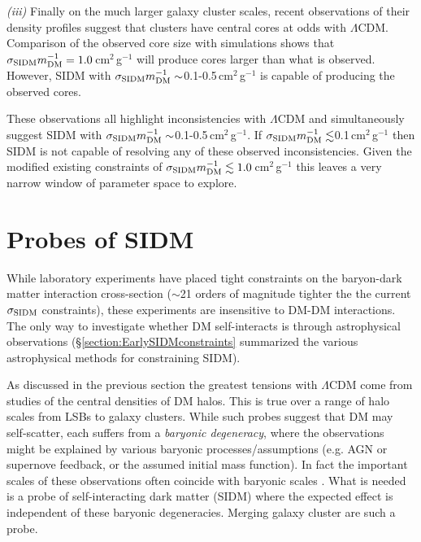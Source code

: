 {\it (iii)} Finally on the much larger galaxy cluster scales, recent observations of their density profiles \citep{Newman:2012wt, Newman:2012tk} suggest that clusters have central cores at odds with $\Lambda$CDM.
Comparison of the observed core size with simulations \citep{Peter:2012vi, Rocha:2012tr} shows that $\sigma_{\rm SIDM}m_{\rm DM}^{-1} = 1.0$\,cm$^2$\,g$^{-1}$ will produce cores larger than what is observed.
However, SIDM with $\sigma_{\rm SIDM}m_{\rm DM}^{-1} \sim$0.1-0.5\,cm$^2$\,g$^{-1}$ is capable of producing the observed cores.

These observations all highlight inconsistencies with $\Lambda$CDM and simultaneously suggest SIDM with $\sigma_{\rm SIDM}m_{\rm DM}^{-1}  \sim$0.1-0.5\,cm$^2$\,g$^{-1}$.
If $\sigma_{\rm SIDM}m_{\rm DM}^{-1}  \lesssim$0.1\,cm$^2$\,g$^{-1}$ then SIDM is not capable of resolving any of these observed inconsistencies.
Given the modified existing constraints of $\sigma_{\rm SIDM}m_{\rm DM}^{-1}\lesssim 1.0$\,cm$^2$\,g$^{-1}$ this leaves a very narrow window of parameter space to explore.

\section{Probes of SIDM}

While laboratory experiments have placed tight constraints on the baryon-dark matter interaction cross-section ($\sim$21 orders of magnitude tighter the the current $\sigma_{\rm SIDM}$ constraints), these experiments are insensitive to DM-DM interactions.
The only way to investigate whether DM self-interacts is through astrophysical observations (\S\ref{section:EarlySIDMconstraints} summarized the various astrophysical methods for constraining SIDM). 

As discussed in the previous section the greatest tensions with $\Lambda$CDM come from studies of the central densities of DM halos.
This is true over a range of halo scales from LSBs to galaxy clusters.
While such probes suggest that DM may self-scatter, each suffers from a \emph{baryonic degeneracy}, where the observations might be explained by various baryonic processes/assumptions (e.g. AGN or supernove feedback, or the assumed initial mass function).
In fact the important scales of these observations often coincide with baryonic scales \citep[e.g. the core size in clusters is approximately the size of the brightest cluster galaxy;][]{Newman:2012wt, Newman:2012tk}.
What is needed is a probe of self-interacting dark matter (SIDM) where the expected effect is independent of these baryonic degeneracies.
Merging galaxy cluster are such a probe. 

